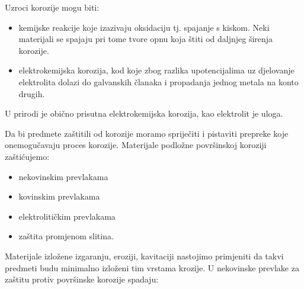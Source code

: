 \documentclass[a4paper,12pt]{article}
\numberwithin{figure}{section}
\begin{document}
Uzroci korozije mogu biti:
\begin{itemize}
\item kemijske reakcije koje izazivaju oksidaciju tj. spajanje s kiskom. Neki materijali se spajaju pri tome tvore opnu koja štiti od daljnjeg širenja korozije. 
\item elektrokemijska korozija, kod koje zbog razlika upotencijalima uz djelovanje elektrolita dolazi do galvanskih članaka i propadanja jednog metala na konto drugih.
\end{itemize}
U prirodi je obično prisutna elektrokemijska korozija, kao elektrolit je uloga. \par
Da bi predmete zaštitili od korozije moramo spriječiti i pistaviti prepreke koje onemogučavaju proces korozije. Materijale podložne površinskoj koroziji zaštićujemo:
\begin{itemize}
\item nekovinskim prevlakama
\item kovinskim prevlakama
\item elektrolitičkim prevlakama
\item zaštita promjenom slitina.
\end{itemize} 
Materijale izložene izgaranju, eroziji, kavitaciji nastojimo primjeniti da takvi predmeti budu minimalno izloženi tim vrstama krozije. U nekovinske prevlake za zaštitu protiv površinske korozije spadaju:
\end{document}
